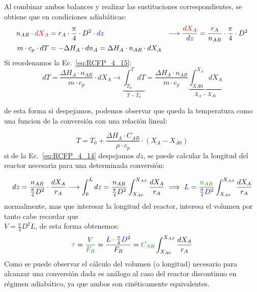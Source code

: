 \begin{flushleft}
    Al combinar ambos balances y realizar las sustituciones correspondientes, se obtiene que en condiciones adiabáticas:
    \begin{align}
        n_{AR} \cdot \textcolor{red}{dX_A} & = r_A \cdot \frac{\pi}{4}\cdot D^2\cdot \textcolor{blue}{dz}                       & \longrightarrow  \frac{\textcolor{red}{dX_A}}{\textcolor{blue}{dz}}  = \frac{r_A}{n_{AR}}     \cdot    \frac{\pi}{4}   \cdot D^2 \label{eq:RCFP_4_14} \\
        m \cdot c_p \cdot dT               & = -\Delta H_A \cdot dn_A = \Delta H_A \cdot n_{AR} \cdot dX_A \label{eq:RCFP_4_15}
    \end{align}
    Si reordenamos la Ec.~\eqref{eq:RCFP_4_15}:
    \begin{equation*}
        dT = \frac{\Delta H_{A}\cdot n_{AR}}{m \cdot c_p} \cdot dX_A \rightarrow \underbrace{\int_{T_{0}}^{T}dT}_{T-T_0} = \frac{\Delta H_{A}\cdot n_{AR}}{m \cdot c_p} \underbrace{\int_{XA0}^{X_{A}} dX_A}_{X_A-X_{A0}}
    \end{equation*}

    de esta forma si despejamos, podemos observar que queda la temperatura como una funcion de la conversión con una relación lineal:

    \begin{equation*}
        T = T_{0} + \frac{\Delta H_{A}\cdot C_{AR}}{\rho \cdot c_p} \cdot (X_A-X_{A0})
    \end{equation*}
    si de la Ec.~\eqref{eq:RCFP_4_14} despejamos $dz$, se puede calcular la longitud del reactor necesaria para una determinada conversión:

    \begin{equation*}
        dz = \frac{n_{AR}}{\frac{\pi}{4}D^2} \cdot \frac{dX_A}{r_A} \longrightarrow  \int_{0}^{L}dz = \frac{n_{AR}}{\frac{\pi}{4}D^2} \int_{X_{A0}}^{X_{AS}}\frac{dX_A}{r_A} \implies \textcolor{blue}{L} = \frac{\textcolor{darkgreen}{n_{AR}}}{\textcolor{blue}{\frac{\pi}{4}D^2}} \int_{X_{A0}}^{X_{AS}}\frac{dX_A}{r_A}
    \end{equation*}
    normalmente, mas que interesar la longitud del reactor, interesa el volumen por tanto cabe recordar que\\
    $V=\frac{\pi}{4}D^2 L$, de esta forma obtenemos:
    \begin{equation}
        \textcolor{darkgreen}{\tau} = \frac{\textcolor{blue}{V}}{\textcolor{darkgreen}{F_R}} = \frac{\textcolor{blue}{L \cdot \frac{\pi}{4}D^2}}{F_R} = \textcolor{darkgreen}{C_{AR}} \int_{X_{A0}}^{X_{AS}}\frac{dX_A}{r_A}
    \end{equation}
    Como se puede observar el cálculo del volumen (o longitud) necesario para alcanzar una conversión dada es análogo al caso del reactor discontinuo en régimen adiabático, ya que ambos son cinéticamente equivalentes.
\end{flushleft}
\newpage

